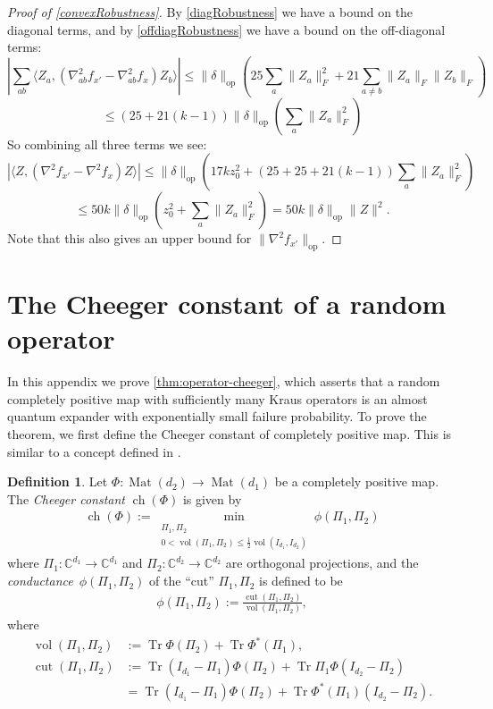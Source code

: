 \documentclass[aos]{imsart}
\theoremstyle{definition}
\newtheorem{definition}[theorem]{Definition}
\numberwithin{equation}{section}
\DeclareMathOperator{\op}{op}
\DeclareMathOperator{\vol}{vol}
\DeclareMathOperator{\cut}{cut}
\DeclareMathOperator{\ch}{ch}
\DeclareMathOperator{\Mat}{Mat}
\DeclareMathOperator{\tr}{Tr}
\newcommand{\C}{{\mathbb{C}}}
\newcommand{\samp}{x}
\newcommand{\CF}[1]{{\color{purple}[CF: #1]}}
\newcommand{\AR}[1]{{\color{orange}[AR: #1]}}
\newcommand{\CF}[1]{{}}
\newcommand{\AR}[1]{{}}
\begin{document}
\begin{appendix}
\begin{proof} [Proof of \cref{convexRobustness}]
By \cref{diagRobustness} we have a bound on the diagonal terms, and by \cref{offdiagRobustness} we have a bound on the off-diagonal terms:
\[ |\sum_{ab} \langle Z_{a}, (\nabla^{2}_{ab} f_{\samp'} - \nabla^{2}_{ab} f_{\samp} ) Z_{b} \rangle | \leq \|\delta\|_{\op} \left( 25 \sum_{a} \|Z_{a}\|_{F}^{2} + 21 \sum_{a \neq b} \|Z_{a}\|_{F} \|Z_{b}\|_{F} \right)   \]
\[ \leq (25 + 21(k-1)) \|\delta\|_{\op} \left( \sum_{a} \|Z_{a}\|_{F}^{2} \right)   \]
So combining all three terms we see:
\[ |\langle Z, (\nabla^{2} f_{\samp'} - \nabla^{2} f_{\samp} ) Z \rangle | \leq \|\delta\|_{\op} \left( 17 k z_{0}^{2} + (25 + 25 + 21 (k-1)) \sum_{a} \|Z_{a}\|_{F}^{2} \right)    \]
\[ \leq 50 k \|\delta\|_{\op} \left( z_{0}^{2} + \sum_{a} \|Z_{a}\|_{F}^{2} \right)  = 50 k \|\delta\|_{\op} \|Z\|^2.  \]
Note that this also gives an upper bound for $\|\nabla^{2} f_{\samp'}\|_{\op}$.
\end{proof}

\section{The Cheeger constant of a random operator}\label{app:cheeky}
In this appendix we prove \cref{thm:operator-cheeger}, which asserts that a random completely positive map with sufficiently many Kraus operators is an almost quantum expander with exponentially small failure probability.
To prove the theorem, we first define the Cheeger constant of completely positive map.
This is similar to a concept defined in \cite{H07}.

\begin{definition}\label{def:cheeger}
Let $\Phi \colon \Mat(d_2) \to \Mat(d_1)$ be a completely positive map.
The \emph{Cheeger constant} $\ch(\Phi)$ is given by
\begin{align*}
  \ch(\Phi) := \min_{\substack{\Pi_1, \Pi_2 \\ 0 < \vol(\Pi_1, \Pi_2) \leq \frac12 \vol(I_{d_1}, I_{d_2})}} \phi(\Pi_1,\Pi_2)
\end{align*}
where $\Pi_1\colon \C^{d_1} \to \C^{d_1}$ and $\Pi_2\colon \C^{d_2} \to \C^{d_2}$ are orthogonal projections, and the \emph{conductance}~$\phi(\Pi_1, \Pi_2)$ of the ``cut'' $\Pi_1, \Pi_2$ is defined to be
\begin{align*}
  \phi(\Pi_1,\Pi_2) := \frac{\cut(\Pi_1, \Pi_2)}{\vol(\Pi_1,\Pi_2)},
\end{align*}
where
\begin{align*}
  \vol(\Pi_1,\Pi_2) &:= \tr \Phi(\Pi_2) + \tr \Phi^*(\Pi_1), \\
  \cut(\Pi_1, \Pi_2) &:= \tr (I_{d_1} - \Pi_1) \Phi(\Pi_2) + \tr \Pi_1 \Phi(I_{d_2} - \Pi_2) \\
  &= \tr (I_{d_1} - \Pi_1) \Phi(\Pi_2) + \tr \Phi^*(\Pi_1) (I_{d_2} - \Pi_2).
\end{align*}
\end{definition}


\end{appendix}
\end{document}
